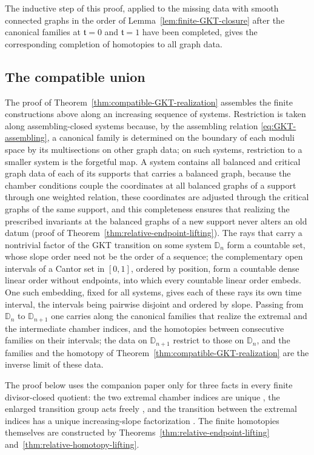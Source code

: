The inductive step of this proof, applied to the missing data with smooth
connected graphs in the order of Lemma~\ref{lem:finite-GKT-closure} after the
canonical families at $\mathfrak t=0$ and $\mathfrak t=1$ have been completed,
gives the corresponding completion of homotopies to all graph data.

\subsection{The compatible union}

The proof of Theorem~\ref{thm:compatible-GKT-realization} assembles the
finite constructions above along an increasing sequence of systems.
Restriction is taken along assembling-closed systems because, by the
assembling relation \eqref{eq:GKT-assembling}, a canonical family is
determined on the boundary of each moduli space by its multisections on other
graph data; on such systems, restriction to a smaller system is the
forgetful map.  A system contains all balanced and critical graph data of
each of its supports that carries a balanced graph, because the chamber
conditions couple the coordinates at all balanced graphs of a support through
one weighted relation, these coordinates are adjusted through the critical
graphs of the same support, and this completeness ensures that realizing the
prescribed invariants at the balanced graphs of a new support never alters
an old datum (proof of
Theorem~\ref{thm:relative-endpoint-lifting}).  The rays that carry a
nontrivial factor of the GKT transition on some system $\mathbb D_n$ form a
countable set, whose slope order
need not be the order of a sequence; the complementary open intervals of a
Cantor set in $[0,1]$, ordered by position, form a countable dense linear
order without endpoints, into which every countable linear order embeds.
One such embedding, fixed for all systems, gives each of these rays its own
time interval, the intervals being pairwise disjoint and ordered by slope.
Passing from $\mathbb D_n$ to $\mathbb D_{n+1}$ one carries along the
canonical families that realize the extremal and the intermediate chamber
indices, and the homotopies between consecutive families on their intervals;
the data on $\mathbb D_{n+1}$ restrict to those on $\mathbb D_n$, and the
families and the homotopy of Theorem~\ref{thm:compatible-GKT-realization}
are the inverse limit of these data.

The proof below uses the companion paper \cite{wuebben2026boundary} only for
three facts in every finite divisor-closed quotient: the two extremal chamber
indices are unique \cite[Thm.~1.1]{wuebben2026boundary}, the enlarged
transition group acts freely \cite[Lem.~2.5]{wuebben2026boundary}, and the
transition between the extremal indices has a unique increasing-slope
factorization \cite[Thm.~1.1 and Prop.~3.1]{wuebben2026boundary}.  The finite
homotopies themselves are constructed by
Theorems~\ref{thm:relative-endpoint-lifting}
and~\ref{thm:relative-homotopy-lifting}.

